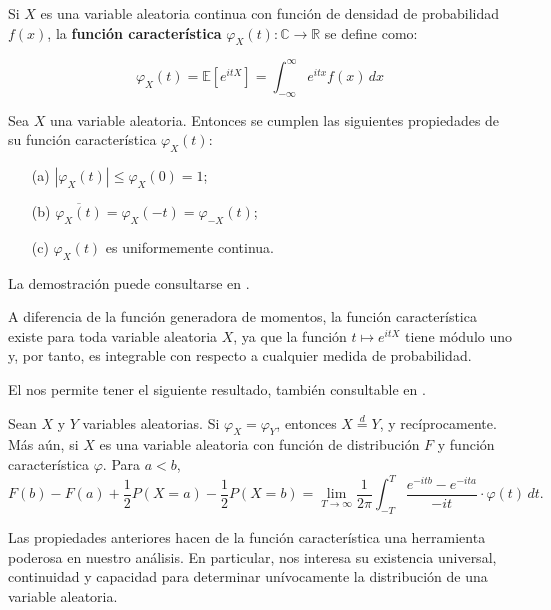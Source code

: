 \documentclass[../Main.tex]{subfiles}
\begin{document}
\begin{definition}
    Si \( X \) es una variable aleatoria continua con función de densidad de probabilidad \( f(x) \), la \textbf{función característica} \( \varphi_X(t) :\mathbb{C}\rightarrow\mathbb{R}\) se define como:

\[
\varphi_X(t) = \mathbb{E}[e^{itX}] = \int_{-\infty}^{\infty} e^{itx} f(x) \, dx
\]

\end{definition}
\begin{lemma}
    Sea \( X \) una variable aleatoria. Entonces se cumplen las siguientes propiedades de su función característica \( \varphi_X(t) \):
\begin{enumerate}
    \item[(a)] \( \left| \varphi_X(t) \right| \le \varphi_X(0) = 1 \);
    \item[(b)] \( \overline{\varphi_X(t)} = \varphi_X(-t) = \varphi_{-X}(t) \);
    \item[(c)] \( \varphi_X(t) \) es uniformemente continua.
\end{enumerate}
La demostración puede consultarse en \cite{gut2013probability}.
\label{lem:fc}
\end{lemma}
\begin{remark}
     A diferencia de la función generadora de momentos, la función característica existe para toda variable aleatoria \( X \), ya que la función \( t \mapsto e^{itX} \) tiene módulo uno y, por tanto, es integrable con respecto a cualquier medida de probabilidad. 
\end{remark}
El  nos permite tener el siguiente resultado, también consultable en \cite{gut2013probability}.
\begin{theorem}
Sean \( X \) y \( Y \) variables aleatorias. Si \( \varphi_X = \varphi_Y \), entonces \( X \overset{d}{=} Y \), y recíprocamente. 
Más aún, si \( X \) es una variable aleatoria con función de distribución \( F \) y función característica \( \varphi \). Para \( a < b \),
\[
F(b) - F(a) + \frac{1}{2} P(X = a) - \frac{1}{2} P(X = b)
= \lim_{T \to \infty} \frac{1}{2\pi} \int_{-T}^{T}
\frac{e^{-itb} - e^{-ita}}{-it} \cdot \varphi(t)\, dt.
\]
\label{teo:fc}
\end{theorem}

Las propiedades anteriores hacen de la función característica una herramienta poderosa en nuestro análisis. En particular, nos interesa su existencia universal, continuidad y capacidad para determinar unívocamente la distribución de una variable aleatoria.
 
\end{document}
